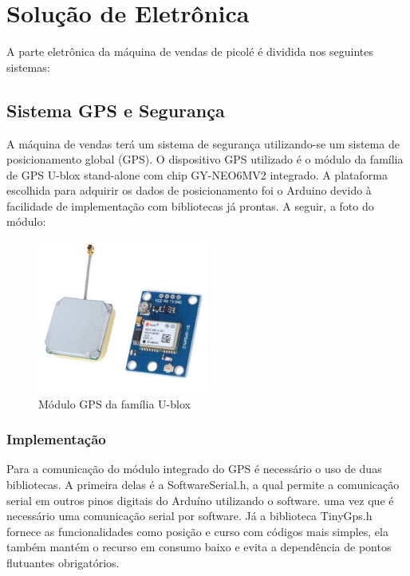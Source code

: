 \section{Solução de Eletrônica}

A parte eletrônica da máquina de vendas de picolé é dividida nos seguintes sistemas:

\subsection{Sistema GPS e Segurança}

A máquina de vendas terá um sistema de segurança utilizando-se um sistema de posicionamento global (GPS). O dispositivo GPS utilizado é o módulo da família de GPS U-blox stand-alone com chip GY-NEO6MV2 integrado. A plataforma escolhida para adquirir os dados de posicionamento foi o Arduino devido à facilidade de implementação com bibliotecas já prontas. A seguir, a foto do módulo:

\begin{figure}[H]
	\centering
    \includegraphics[width=0.5\textwidth]{figuras/modulo_gps}
    \caption{Módulo GPS da família U-blox}
    \label{fig:GPS}
\end{figure}

\subsubsection{Implementação}

Para a comunicação do módulo integrado do GPS é necessário o uso de duas bibliotecas. A primeira delas é a SoftwareSerial.h, a qual permite a comunicação serial em outros pinos digitais do Arduíno utilizando o software.  uma vez que é necessário uma comunicação serial por software. Já a biblioteca TinyGps.h fornece as funcionalidades como posição e curso com códigos mais simples, ela também mantém o recurso em consumo baixo e evita a dependência de pontos flutuantes obrigatórios.

